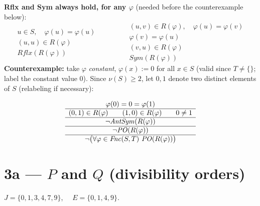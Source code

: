 \documentclass[11pt]{article}
\newcommand{\op}[1]{\mathit{#1}}
\newcommand{\Fnc}{\op{Fnc}} \newcommand{\Inj}{\op{Inj}} \newcommand{\Srj}{\op{Srj}}
\begin{document}
\noindent\textbf{Rflx and Sym always hold, for any $\varphi$} (needed before the counterexample below):
\[
\begin{array}{c}
u\in S,\quad \varphi(u)=\varphi(u)\\
\hline
(u,u)\in R(\varphi)\\
\hline
\op{Rflx}(R(\varphi))
\end{array}
\qquad\qquad
\begin{array}{c}
(u,v)\in R(\varphi),\quad \varphi(u)=\varphi(v)\\
\hline
\varphi(v)=\varphi(u)\\
\hline
(v,u)\in R(\varphi)\\
\hline
\op{Sym}(R(\varphi))
\end{array}
\]
\noindent\textbf{Counterexample:} take $\varphi$ \emph{constant}, $\varphi(x):=0$ for all $x\in S$ (valid since $T\ne\{\}$; label the constant value $0$). Since $\nu(S)\ge2$, let $0,1$ denote two distinct elements of $S$ (relabeling if necessary):
\begin{center}
\end{center}
\[
\begin{array}{c}
\varphi(0)=0=\varphi(1)\\
\hline
(0,1)\in R(\varphi) \qquad (1,0)\in R(\varphi) \qquad 0\ne1\\
\hline
\neg\op{AntSym}(R(\varphi))\\
\hline
\neg\PO(R(\varphi))\\
\hline
\neg\big(\forall\varphi\in\Fnc(S,T)\ \PO(R(\varphi))\big)
\end{array}
\]

\clearpage
\section*{3a --- $P$ and $Q$ (divisibility orders)}
$J=\{0,1,3,4,7,9\}$, $\quad E=\{0,1,4,9\}$.
\end{document}
